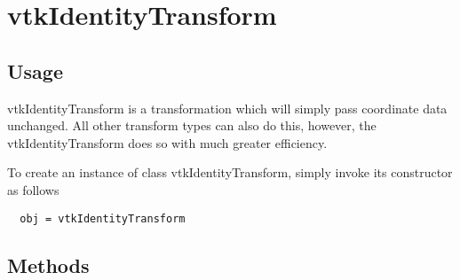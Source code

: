\section{vtkIdentityTransform}

\subsection{Usage}

 vtkIdentityTransform is a transformation which will simply pass coordinate
 data unchanged.  All other transform types can also do this, however,
 the vtkIdentityTransform does so with much greater efficiency.

To create an instance of class vtkIdentityTransform, simply
invoke its constructor as follows
\begin{verbatim}
  obj = vtkIdentityTransform
\end{verbatim}
\subsection{Methods}

